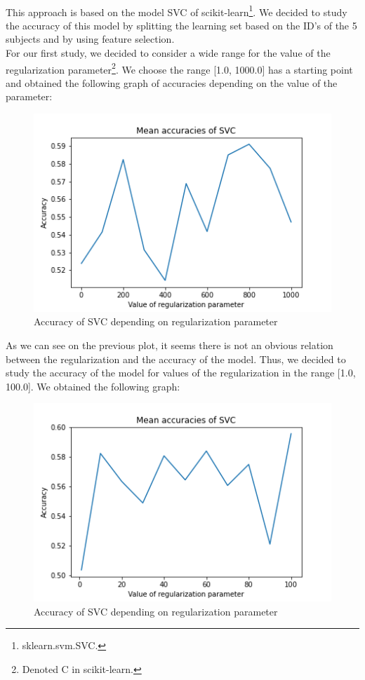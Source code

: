 \documentclass[a4paper, 11pt, oneside]{article}
\begin{document}
\paragraph{}This approach is based on the model SVC of scikit-learn\footnote{sklearn.svm.SVC.}. We decided to study the accuracy of this model by splitting the learning set based on the ID's of the 5 subjects and by using feature selection.\\
For our first study, we decided to consider a wide range for the value of the regularization parameter\footnote{Denoted C in scikit-learn.}. We choose the range [1.0, 1000.0] has a starting point and obtained the following graph of accuracies depending on the value of the parameter:
\begin{figure}[H]
\centering
\includegraphics[scale=0.4]{svm/svm_svc_accuracies_1.png}
\caption{Accuracy of SVC depending on regularization parameter}
\end{figure}
As we can see on the previous plot, it seems there is not an obvious relation between the regularization and the accuracy of the model. Thus, we decided to study the accuracy of the model for values of the regularization in the range [1.0, 100.0]. We obtained the following graph:
\begin{figure}[H]
\centering
\includegraphics[scale=0.4]{svm/svm_svc_accuracies_2.png}
\caption{Accuracy of SVC depending on regularization parameter}
\end{figure}
\end{document}

